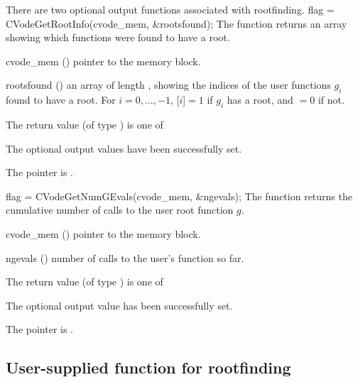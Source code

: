 There are two optional output functions associated with rootfinding.
{
  flag = CVodeGetRootInfo(cvode\_mem, \&rootsfound);
}
{
  The function  returns an array showing which 
  functions were found to have a root.
}
{
  \begin{args}
  \item[cvode\_mem] ()
    pointer to the {\cvode} memory block.
  \item[rootsfound] ()
    an  array of length , showing the indices
    of the user functions $g_i$ found to have a root.  For
    $i=0,\ldots,$$-1$, [$i$]$=1$ if $g_i$
    has a root, and $=0$ if not.
  \end{args}
}
{
  The return value  (of type ) is one of
  \begin{args}
  \item[\Id{CV\_SUCCESS}] 
    The optional output values have been successfully set.
  \item[\Id{CV\_MEM\_NULL}]
    The  pointer is .
  \end{args}
}
{}
{
  flag = CVodeGetNumGEvals(cvode\_mem, \&ngevals);
}
{
  The function  returns the cumulative
  number of calls to the user root function $g$.
}
{
  \begin{args}
  \item[cvode\_mem] ()
    pointer to the {\cvode} memory block.
  \item[ngevals] ()
    number of calls to the user's function  so far.
  \end{args}
}
{
  The return value  (of type ) is one of
  \begin{args}
  \item[\Id{CV\_SUCCESS}] 
    The optional output value has been successfully set.
  \item[\Id{CV\_MEM\_NULL}]
    The  pointer is .
  \end{args}
}
{}

\subsection{User-supplied function for rootfinding}\label{ss:root_us}

